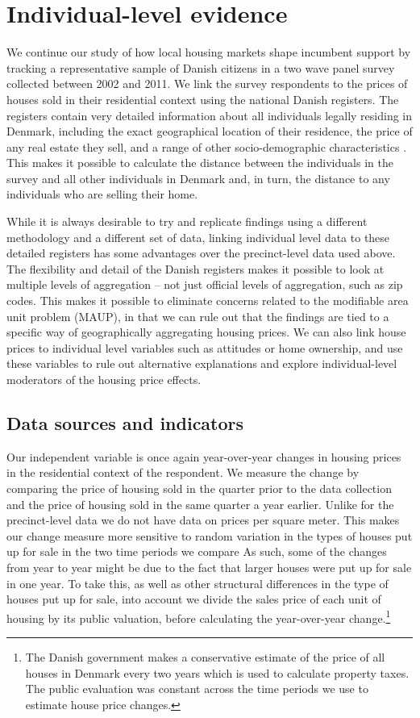 \documentclass[12pt,a4paper]{article}
\begin{document}
\section{Individual-level evidence}\label{individuallevel}
We continue our study of how local housing markets shape incumbent support by tracking a representative sample of Danish citizens in a two wave panel survey collected between 2002 and 2011. We link the survey respondents to the prices of houses sold in their residential context using the national Danish registers. The registers contain very detailed information about all individuals legally residing in Denmark, including the exact geographical location of their residence, the price of any real estate they sell, and a range of other socio-demographic characteristics \citep{thygesen2011introduction}. This makes it possible to calculate the distance between the individuals in the survey and all other individuals in Denmark and, in turn, the distance to any individuals who are selling their home. 
 
 While it is always desirable to try and replicate findings using a different methodology and a different set of data, linking individual level data to these detailed registers has some advantages over the precinct-level data used above. The flexibility and detail of the Danish registers makes it possible to look at multiple levels of aggregation -- not just official levels of aggregation, such as zip codes. This makes it possible to eliminate concerns related to the modifiable area unit problem (MAUP), in that we can rule out that the findings are tied to a specific way of geographically aggregating housing prices.  We can also link house prices to individual level variables such as attitudes or home ownership, and use these variables to rule out alternative explanations and explore individual-level moderators of the housing price effects.




\subsection{Data sources and indicators}
Our independent variable is once again year-over-year changes in housing prices in the residential context of the respondent. We measure the change by comparing the price of housing sold in the quarter prior to the data collection and the price of housing sold in the same quarter a year earlier. Unlike for the precinct-level data  we do not have data on prices per square meter. This makes our change measure more sensitive to random variation in the types of houses put up for sale in the two time periods we compare As such, some of the changes from year to year might be due to the fact that larger houses were put up for sale in one year. To take this, as well as other structural differences in the type of houses put up for sale, into account we divide the sales price of each unit of housing by its public valuation, before calculating the year-over-year change.\footnote{The Danish government makes a conservative estimate of the price of all houses in Denmark every two years which is used to calculate property taxes. The public evaluation was constant across the time periods we use to estimate house price changes.} 
\end{document}
